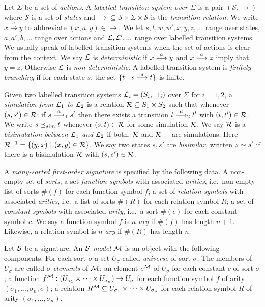 Let $\Sigma$ be a set of \emph{actions}.  A \emph{labelled transition
  system over $\Sigma$} is a pair $(\mathcal{S}, \rightarrow)$ where
$\mathcal{S}$ is a set of \emph{states} and $\rightarrow \subseteq
\mathcal{S} \times \Sigma \times \mathcal{S}$ is the \emph{transition
  relation}.  We write $x \xrightarrow{a} y$ to abbreviate $(x,a,y)
\in \rightarrow$. We let $s, t, w, w', x, y, z, ...$ range over
states, $a, a', b, ...$ range over actions and $\mathcal{L}, \mathcal{L}', ...$
range over labelled transition systems. We usually speak of labelled
transition systems  when the set of actions is clear from the
context.  We say $\mathcal{L}$ is \emph{deterministic} if $x \stackrel{a}{\longrightarrow} y$ and
$x \stackrel{a}{\longrightarrow} z$ imply that $y = z$. Otherwise $\mathcal{L}$ is
\emph{non-deterministic}.  A labelled transition system is
\emph{finitely branching} if for each state $s$, the set $\{t\ |\ s
\stackrel{a}{\longrightarrow} t\}$ is finite.

Given two labelled transition systems $\mathcal{L}_i = (S_i, \rightarrow_i)$
over $\Sigma$ for $i = 1, 2$, a \emph{simulation from $\mathcal{L}_1$ to
  $\mathcal{L}_2$} is a relation $\mathcal{R} \subseteq S_1 \times S_2$ such that
whenever $(s, s') \in \mathcal{R}$: if $s \stackrel{a}{\longrightarrow}_1 s'$ then there exists a
transition $t \stackrel{a}{\longrightarrow}_2 t'$ with $(t, t') \in \mathcal{R}$.  We write $s \preceq_{sim}
t$ whenever $(s, t) \in \mathcal{R}$ for some simulation $\mathcal{R}$.  We say
$\mathcal{R}$ is a \emph{bisimulation between $\mathcal{L}_1$ and $\mathcal{L}_2$} if both,
$\mathcal{R}$ and $\mathcal{R}^{-1}$ are simulations. Here $\mathcal{R}^{-1} = \{(y,
x)\ |\ (x, y) \in \mathcal{R}\}$.  We say two states $s, s'$ are
\emph{bisimilar}, written $s \sim s'$ if there is a bisimulation
$\mathcal{R}$ with $(s, s') \in \mathcal{R}$.

A \emph{many-sorted first-order signature} is specified by the
following data.  A non-empty set of \emph{sorts}, a set \emph{function
  symbols} with associated \emph{arities}, i.e.~non-empty list of
sorts $\#(f)$ for each function symbol $f$; a set of \emph{relation
  symbols} with associated \emph{arities}, i.e.~a list of sorts
$\#(R)$ for each relation symbol $R$; a set of \emph{constant symbols}
with associated \emph{arity}, i.e.~a sort $\#(c)$ for each constant
symbol $c$. We say a function symbol $f$ is \emph{$n$-ary} if $\#(f)$
has length $n+1$. Likewise, a relation symbol is \emph{$n$-ary} if
$\#(R)$ has length $n$.

Let $\mathcal{S}$ be a signature. An \emph{$\mathcal{S}$-model} $\mathcal{M}$ is an
object with the following components.  For each sort $\sigma$ a set
$U_{\sigma}$ called \emph{universe} of sort $\sigma$.  The members of
$U_{\sigma}$ are called \emph{$\sigma$-elements} of $\mathcal{M}$; an
element $c^{\mathcal{M}}$ of $U_{\sigma}$ for each constant $c$ of sort
$\sigma$; a function $f^{\mathcal{M}} : (U_{\sigma_1}\times \dots \times
U_{\sigma_n}) \rightarrow U_{\sigma}$ for each function symbol $f$ of
arity $(\sigma_1, ..., \sigma_n, \sigma)$; a relation $R^{\mathcal{M}}
\subseteq U_{\sigma_1}\times \dots \times U_{\sigma_n}$ for each
relation symbol $R$ of arity $(\sigma_1, ..., \sigma_n)$.

